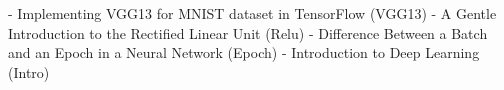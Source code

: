 %


- Implementing VGG13 for MNIST dataset in TensorFlow (VGG13)
- A Gentle Introduction to the Rectified Linear Unit (Relu)
- Difference Between a Batch and an Epoch in a Neural Network (Epoch)
- Introduction to Deep Learning (Intro)